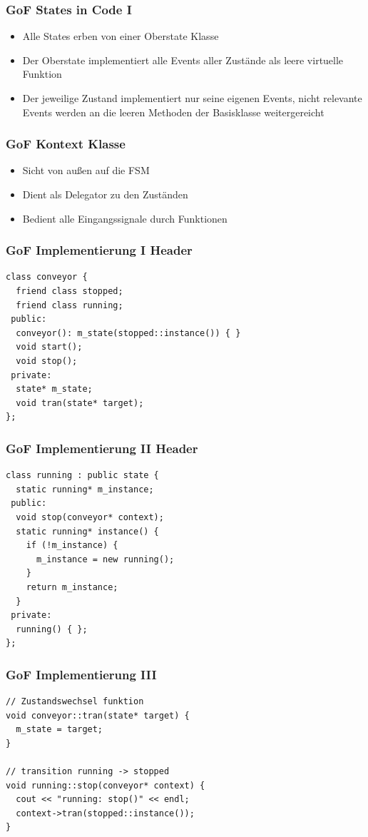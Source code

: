 \documentclass{beamer}
\begin{document}
\begin{frame}
 \frametitle{GoF States in Code I}
 \begin{itemize}
  \item Alle States erben von einer Oberstate Klasse
  \item Der Oberstate implementiert alle Events aller Zust\"ande als leere virtuelle Funktion
  \item Der jeweilige Zustand implementiert nur seine eigenen Events, nicht relevante
  Events werden an die leeren Methoden der Basisklasse weitergereicht
 \end{itemize}
\end{frame}

\begin{frame}
 \frametitle{GoF Kontext Klasse}
 \begin{itemize}
  \item Sicht von au{\ss}en auf die FSM
  \item Dient als Delegator zu den Zust\"anden
  \item Bedient alle Eingangssignale durch Funktionen
 \end{itemize}
\end{frame}

\begin{frame}[fragile]
 \frametitle{GoF Implementierung I Header}
 \begin{lstlisting}
class conveyor {
  friend class stopped;
  friend class running;
 public:
  conveyor(): m_state(stopped::instance()) { }
  void start();
  void stop();
 private:
  state* m_state;
  void tran(state* target);
};
 \end{lstlisting}
\end{frame}

\begin{frame}[fragile]
 \frametitle{GoF Implementierung II Header}
 \begin{lstlisting}
class running : public state {
  static running* m_instance;
 public:
  void stop(conveyor* context);
  static running* instance() {
    if (!m_instance) {
      m_instance = new running();
    }
    return m_instance;
  }
 private:
  running() { };
};
 \end{lstlisting}
\end{frame}

\begin{frame}[fragile]
 \frametitle{GoF Implementierung III}
 \begin{lstlisting}
// Zustandswechsel funktion
void conveyor::tran(state* target) {
  m_state = target;
}

// transition running -> stopped
void running::stop(conveyor* context) {
  cout << "running: stop()" << endl;
  context->tran(stopped::instance());
}
 \end{lstlisting}
\end{frame}
\end{document}
